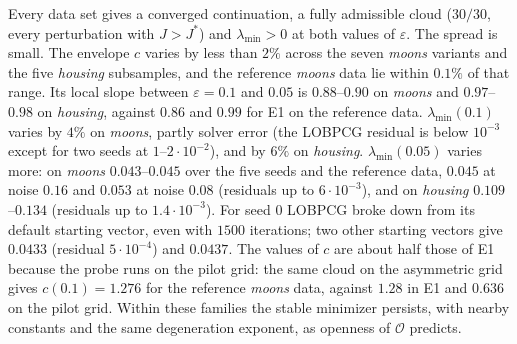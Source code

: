 \documentclass[11pt,leqno]{amsart}
\newcommand{\cO}{\mathcal{O}}
\newcommand{\eps}{\varepsilon}
\numberwithin{equation}{section}
\theoremstyle{definition}
\begin{document}
Every data set gives a converged continuation, a fully admissible cloud
($30/30$, every perturbation with $J>J^*$) and $\lambda_{\min}>0$ at both
values of $\eps$.  The spread is small.  The envelope $c$ varies by less
than $2\%$ across the seven \emph{moons} variants and the five
\emph{housing} subsamples, and the reference \emph{moons} data lie within
$0.1\%$ of that range.  Its local slope between $\eps=0.1$ and $0.05$ is $0.88$--$0.90$
on \emph{moons} and $0.97$--$0.98$ on \emph{housing}, against $0.86$ and
$0.99$ for E1 on the reference data.  $\lambda_{\min}(0.1)$ varies by $4\%$
on \emph{moons}, partly solver error (the LOBPCG residual is below
$10^{-3}$ except for two seeds at $1$--$2\cdot10^{-2}$), and by $6\%$ on
\emph{housing}.  $\lambda_{\min}(0.05)$ varies more: on \emph{moons}
$0.043$--$0.045$ over the five seeds and the reference data, $0.045$ at
noise $0.16$ and $0.053$ at noise $0.08$ (residuals up to
$6\cdot10^{-3}$), and on \emph{housing} $0.109$--$0.134$ (residuals up to
$1.4\cdot10^{-3}$).  For seed $0$ LOBPCG broke down from its default
starting vector, even with $1500$ iterations; two other starting vectors
give $0.0433$ (residual $5\cdot10^{-4}$) and $0.0437$.  The values
of $c$ are about half those of E1 because the probe runs on the pilot grid:
the same cloud on the asymmetric grid gives $c(0.1)=1.276$ for the reference
\emph{moons} data, against $1.28$ in E1 and $0.636$ on the pilot grid.
Within these families the stable minimizer persists, with nearby constants
and the same degeneration exponent, as openness of $\cO$ predicts.
\end{document}
